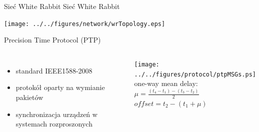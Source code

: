 \documentclass[compress,red]{beamer}
\begin{document}
\begin{frame}{Sieć White Rabbit}
\center Sieć White Rabbit
  \begin{center}
  \texttt{[image: ../../figures/network/wrTopology.eps]}
  \end{center}
\end{frame}
\begin{frame}{Precision Time Protocol (PTP)}
\begin{columns}[c]
\column{2.8in}

  \begin{itemize}
    \item standard IEEE1588-2008
    \item protokół oparty na wymianie pakietów
    \item synchronizacja urządzeń w systemach rozproszonych
  \end{itemize}

\column{1.5in}
    \texttt{[image: ../../figures/protocol/ptpMSGs.ps]} \\
    \small 
    one-way mean delay: \\
    $\mu = \frac{(t_{4}-t_{1}) - (t_{3}-t_{2})}{2}$ \\
    \small 
    $offset = t_{2} - (t_{1} + \mu)$
    
\end{columns}


\end{frame}
\end{document}
